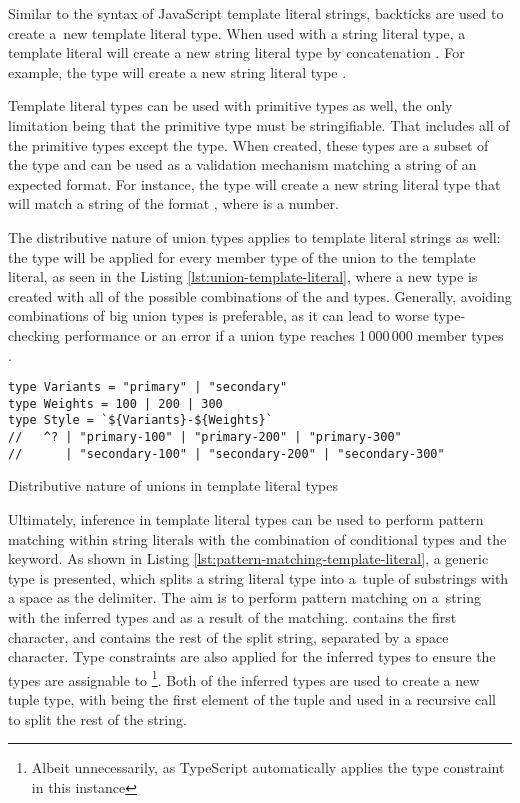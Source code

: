 Similar to the syntax of JavaScript template literal strings, backticks are used to create a~new template literal type. When used with a string literal type, a template literal will create a new string literal type by concatenation \cite{DocumentationTemplateLiteral}. For example, the type  will create a new string literal type .

Template literal types can be used with primitive types as well, the only limitation being that the primitive type must be stringifiable. That includes all of the primitive types except the  type. When created, these types are a subset of the  type and can be used as a validation mechanism matching a string of an expected format. For instance, the type  will create a new string literal type that will match a string of the format , where  is a number.

The distributive nature of union types applies to template literal strings as well: the type will be applied for every member type of the union to the template literal, as seen in the Listing \ref{lst:union-template-literal}, where a new  type is created with all of the possible combinations of the  and  types. Generally, avoiding combinations of big union types is preferable, as it can lead to worse type-checking performance or an error if a union type reaches 1\,000\,000 member types \cite{ImplementationCheckerTs2023}.

\begin{listing}[ht]
  \begin{verbatim}
type Variants = "primary" | "secondary"
type Weights = 100 | 200 | 300
type Style = `${Variants}-${Weights}`
//   ^? | "primary-100" | "primary-200" | "primary-300" 
//      | "secondary-100" | "secondary-200" | "secondary-300"
\end{verbatim}
  \caption{Distributive nature of unions in template literal types}\label{lst:union-template-literal}
\end{listing}

\clearpage

Ultimately, inference in template literal types can be used to perform pattern matching within string literals with the combination of conditional types and the  keyword. As shown in Listing \ref{lst:pattern-matching-template-literal}, a generic type  is presented, which splits a string literal type into a~tuple of substrings with a space as the delimiter. The aim is to perform pattern matching on a~string with the inferred types  and  as a result of the matching.  contains the first character, and  contains the rest of the split string, separated by a space character. Type constraints are also applied for the inferred types to ensure the types are assignable to \footnote{Albeit unnecessarily, as TypeScript automatically applies the  type constraint in this instance}. Both of the inferred types are used to create a new tuple type, with  being the first element of the tuple and  used in a recursive call to split the rest of the string.

